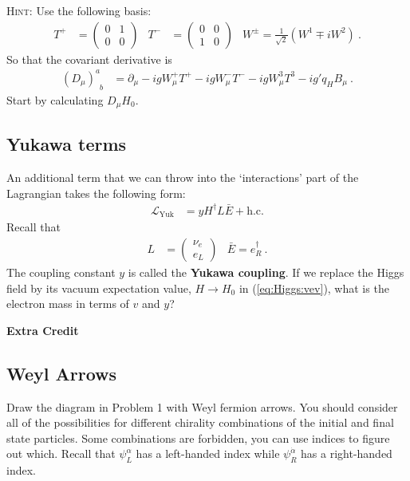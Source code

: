 \documentclass[12pt]{article}
\begin{document}
\textsc{Hint}: Use the following basis:
\begin{align}
	T^+ &= 
	\begin{pmatrix}
	0 & 1 \\
	0 & 0	
	\end{pmatrix}
	&
	T^- &=
	\begin{pmatrix}
	0 & 0 \\
	1 & 0	
	\end{pmatrix}
	&
	W^\pm = \frac{1}{\sqrt{2}}\left(W^1 \mp i W^2\right) \ .
\end{align}
So that the covariant derivative is
\begin{align}
	\left(D_\mu\right)^a_{\phantom{a}b} &= \partial_\mu 
	- i g W_\mu^+ T^+
	- i g W_\mu^- T^-
	- i g W_\mu^3 T^3
	- ig' q_H B_\mu \ .
\end{align}
Start by calculating $D_\mu H_0$.


\subsection{Yukawa terms}

An additional term that we can throw into the `interactions' part of the Lagrangian takes the following form:
\begin{align}
	\mathcal L_\text{Yuk} &=
	y H^\dag L \bar E + \text{h.c.}
\end{align}
Recall that 
\begin{align}
	L &= \begin{pmatrix}
		\nu_e \\
		e_L
	\end{pmatrix}
	&
	\bar E = e_R^\dag \ .
\end{align}
The coupling constant $y$ is called the \textbf{Yukawa coupling}. If we replace the Higgs field by its vacuum expectation value, $H\to H_0$ in (\ref{eq:Higgs:vev}), what is the electron mass in terms of $v$ and $y$?


\appendix
\vspace{1em}
{\Large\textbf{Extra Credit}}






\subsection{Weyl Arrows}

Draw the diagram in Problem 1 with Weyl fermion arrows.  You should consider all of the possibilities for different chirality combinations of the initial and final state particles. Some combinations are forbidden, you can use indices to figure out which. Recall that $\psi_L^\alpha$ has a left-handed index while $\psi_R^{\dot\alpha}$ has a right-handed index. 
\end{document}

